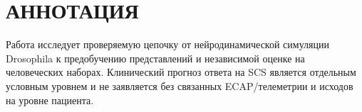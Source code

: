 \chapter*{АННОТАЦИЯ}
Работа исследует проверяемую цепочку от нейродинамической симуляции Drosophila к
предобучению представлений и независимой оценке на человеческих наборах. Клинический
прогноз ответа на SCS является отдельным условным уровнем и не заявляется без связанных
ECAP/телеметрии и исходов на уровне пациента.

